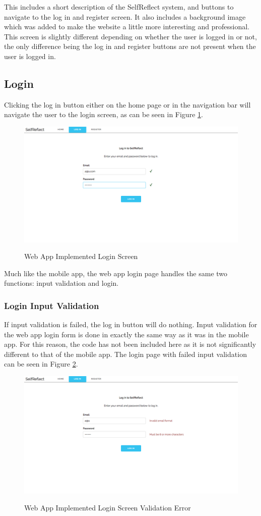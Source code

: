 \documentclass[11pt,openright,a4paper]{report}
\begin{document}
This includes a short description of the SelfReflect system, and buttons to navigate to the log in and register screen. It also includes a background image which was added to make the website a little more interesting and professional. This screen is slightly different depending on whether the user is logged in or not, the only difference being the log in and register buttons are not present when the user is logged in.

\subsection{Login}
Clicking the log in button either on the home page or in the navigation bar will navigate the user to the login screen, as can be seen in Figure \ref{fig:webloginimpl}.

\begin{figure}[ht]
\centering
\caption{Web App Implemented Login Screen}
\includegraphics[width=.8\textwidth]{i/webloginimpl.png}
\label{fig:webloginimpl}
\end{figure}

Much like the mobile app, the web app login page handles the same two functions: input validation and login.

\newpage
\subsubsection{Login Input Validation}
If input validation is failed, the log in button will do nothing. Input validation for the web app login form is done in exactly the same way as it was in the mobile app. For this reason, the code has not been included here as it is not significantly different to that of the mobile app. The login page with failed input validation can be seen in Figure \ref{fig:webloginerror}.

\begin{figure}[ht]
\centering
\caption{Web App Implemented Login Screen Validation Error}
\includegraphics[width=.8\textwidth]{i/webloginerror.png}
\label{fig:webloginerror}
\end{figure}
\end{document}
